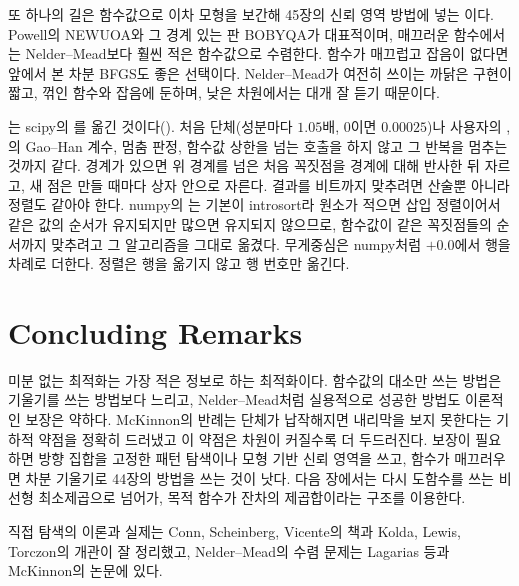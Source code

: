 또 하나의 길은 함수값으로 이차 모형을 보간해 45장의 신뢰 영역 방법에 넣는 이다. Powell의 NEWUOA\cite{powell2006newuoa}와 그 경계 있는 판 BOBYQA가 대표적이며, 매끄러운 함수에서는 Nelder--Mead보다 훨씬 적은 함수값으로 수렴한다. 함수가 매끄럽고 잡음이 없다면 앞에서 본 차분 BFGS도 좋은 선택이다. Nelder--Mead가 여전히 쓰이는 까닭은 구현이 짧고, 꺾인 함수와 잡음에 둔하며, 낮은 차원에서는 대개 잘 듣기 때문이다.

\begin{instardust}
는 scipy의 를 옮긴 것이다(). 처음 단체(성분마다 $1.05$배, $0$이면 $0.00025$)나 사용자의 , 의 Gao--Han 계수, 멈춤 판정, 함수값 상한을 넘는 호출을 하지 않고 그 반복을 멈추는 것까지 같다. 경계가 있으면 위 경계를 넘은 처음 꼭짓점을 경계에 대해 반사한 뒤 자르고, 새 점은 만들 때마다 상자 안으로 자른다. 결과를 비트까지 맞추려면 산술뿐 아니라 정렬도 같아야 한다. numpy의 는 기본이 introsort라 원소가 적으면 삽입 정렬이어서 같은 값의 순서가 유지되지만 많으면 유지되지 않으므로, 함수값이 같은 꼭짓점들의 순서까지 맞추려고 그 알고리즘을 그대로 옮겼다. 무게중심은 numpy처럼 $+0.0$에서 행을 차례로 더한다. 정렬은 행을 옮기지 않고 행 번호만 옮긴다.
\end{instardust}

\section{Concluding Remarks}

미분 없는 최적화는 가장 적은 정보로 하는 최적화이다. 함수값의 대소만 쓰는 방법은 기울기를 쓰는 방법보다 느리고, Nelder--Mead처럼 실용적으로 성공한 방법도 이론적인 보장은 약하다. McKinnon의 반례는 단체가 납작해지면 내리막을 보지 못한다는 기하적 약점을 정확히 드러냈고 이 약점은 차원이 커질수록 더 두드러진다. 보장이 필요하면 방향 집합을 고정한 패턴 탐색이나 모형 기반 신뢰 영역을 쓰고, 함수가 매끄러우면 차분 기울기로 44장의 방법을 쓰는 것이 낫다. 다음 장에서는 다시 도함수를 쓰는 비선형 최소제곱으로 넘어가, 목적 함수가 잔차의 제곱합이라는 구조를 이용한다.

직접 탐색의 이론과 실제는 Conn, Scheinberg, Vicente의 책\cite{conn2009dfo}과 Kolda, Lewis, Torczon의 개관\cite{kolda2003}이 잘 정리했고, Nelder--Mead의 수렴 문제는 Lagarias 등\cite{lagarias1998}과 McKinnon\cite{mckinnon1998}의 논문에 있다.

\chapterreferences
